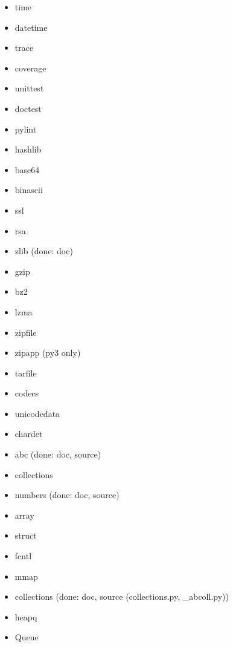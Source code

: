 \documentclass{article}
\begin{document}
\begin{enumerate}
\begin{itemize}
            \item time
            \item datetime

            \item trace
            \item coverage
            \item unittest
            \item doctest

            \item pylint

            \item hashlib

            \item base64
            \item binascii

            \item ssl
            \item rsa

            \item zlib (done: doc)
            \item gzip
            \item bz2
            \item lzma
            \item zipfile
            \item zipapp (py3 only)
            \item tarfile

            \item codecs
            \item unicodedata
            \item chardet

            \item abc (done: doc, source)
            \item collections
            \item numbers (done: doc, source)

            \item array
            \item struct
            \item fcntl
            \item mmap

            \item collections (done: doc, source (collections.py, _abcoll.py))
            \item heapq
            \item Queue


\end{itemize}
\end{enumerate}
\end{document}
